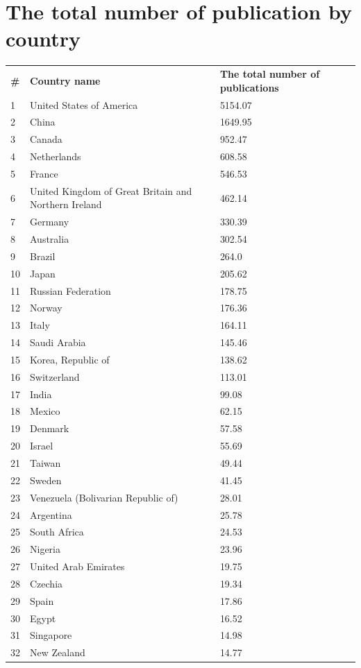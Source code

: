 \documentclass[geosciences,article,submit,moreauthors,pdftex]{Definitions/mdpi}
\begin{document}
\section{The total number of publication by country}
\begin{tabular}{@{}p{0.5cm}<{}@{}p{9cm}<{\dotfill}@{}p{\dimexpr\linewidth-4cm}@{}}
\textbf{\#} & \textbf{Country name} & \textbf{The total number of publications} \\
1 & United States of America & 5154.07\\
2 & China & 1649.95\\
3 & Canada & 952.47\\
4 & Netherlands & 608.58\\
5 & France & 546.53\\
6 & United Kingdom of Great Britain and Northern Ireland & 462.14\\
7 & Germany & 330.39\\
8 & Australia & 302.54\\
9 & Brazil & 264.0\\
10 & Japan & 205.62\\
11 & Russian Federation & 178.75\\
12 & Norway & 176.36\\
13 & Italy & 164.11\\
14 & Saudi Arabia & 145.46\\
15 & Korea, Republic of & 138.62\\
16 & Switzerland & 113.01\\
17 & India & 99.08\\
18 & Mexico & 62.15\\
19 & Denmark & 57.58\\
20 & Israel & 55.69\\
21 & Taiwan & 49.44\\
22 & Sweden & 41.45\\
23 & Venezuela (Bolivarian Republic of) & 28.01\\
24 & Argentina & 25.78\\
25 & South Africa & 24.53\\
26 & Nigeria & 23.96\\
27 & United Arab Emirates & 19.75\\
28 & Czechia & 19.34\\
29 & Spain & 17.86\\
30 & Egypt & 16.52\\
31 & Singapore & 14.98\\
32 & New Zealand & 14.77\\

\end{tabular}
\end{document}
